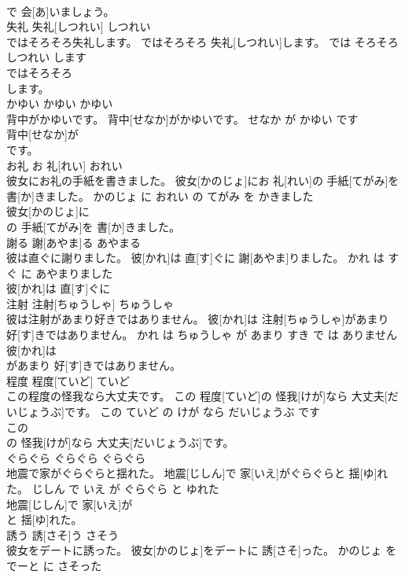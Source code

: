\documentclass[8pt]{extreport}
\begin{document}
\begin{CJK}{UTF8}{min}
\\	で 会[あ]いましょう。			
\\	失礼	失礼[しつれい]	しつれい	
\\	ではそろそろ失礼します。	ではそろそろ 失礼[しつれい]します。	では そろそろ しつれい します	
\\	ではそろそろ
\\	します。			
\\	かゆい	かゆい	かゆい	
\\	背中がかゆいです。	背中[せなか]がかゆいです。	せなか が かゆい です	
\\	背中[せなか]が
\\	です。			
\\	お礼	お 礼[れい]	おれい	
\\	彼女にお礼の手紙を書きました。	彼女[かのじょ]にお 礼[れい]の 手紙[てがみ]を 書[か]きました。	かのじょ に おれい の てがみ を かきました	
\\	彼女[かのじょ]に
\\	の 手紙[てがみ]を 書[か]きました。			
\\	謝る	謝[あやま]る	あやまる	
\\	彼は直ぐに謝りました。	彼[かれ]は 直[す]ぐに 謝[あやま]りました。	かれ は すぐ に あやまりました	
\\	彼[かれ]は 直[す]ぐに
\\	注射	注射[ちゅうしゃ]	ちゅうしゃ	
\\	彼は注射があまり好きではありません。	彼[かれ]は 注射[ちゅうしゃ]があまり 好[す]きではありません。	かれ は ちゅうしゃ が あまり すき で は ありません	
\\	彼[かれ]は
\\	があまり 好[す]きではありません。			
\\	程度	程度[ていど]	ていど	
\\	この程度の怪我なら大丈夫です。	この 程度[ていど]の 怪我[けが]なら 大丈夫[だいじょうぶ]です。	この ていど の けが なら だいじょうぶ です	
\\	この
\\	の 怪我[けが]なら 大丈夫[だいじょうぶ]です。			
\\	ぐらぐら	ぐらぐら	ぐらぐら	
\\	地震で家がぐらぐらと揺れた。	地震[じしん]で 家[いえ]がぐらぐらと 揺[ゆ]れた。	じしん で いえ が ぐらぐら と ゆれた	
\\	地震[じしん]で 家[いえ]が
\\	と 揺[ゆ]れた。			
\\	誘う	誘[さそ]う	さそう	
\\	彼女をデートに誘った。	彼女[かのじょ]をデートに 誘[さそ]った。	かのじょ を でーと に さそった	

\end{CJK}
\end{document}
